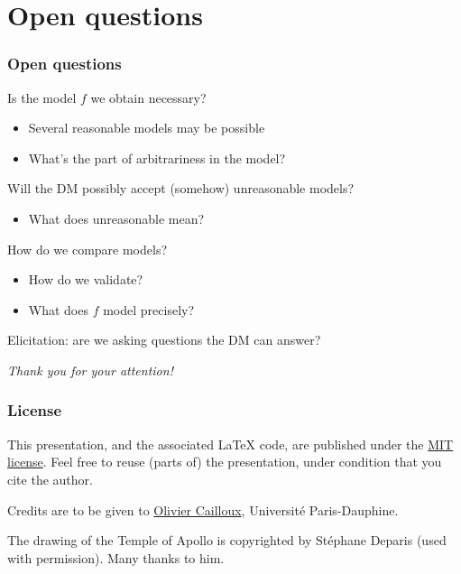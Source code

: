 \documentclass[french,english]{beamer}
\begin{document}
\section{Open questions}
\begin{frame}
	\frametitle{Open questions}
	Is the model $f$ we obtain necessary?
	\begin{itemize}
		\item Several reasonable models may be possible
		\item What’s the part of arbitrariness in the model?
	\end{itemize}
	Will the \ac{DM} possibly accept (somehow) unreasonable models?
	\begin{itemize}
		\item What does unreasonable mean?
	\end{itemize}
	How do we compare models?
	\begin{itemize}
		\item How do we validate?
		\item What does $f$ model precisely?
	\end{itemize}
	Elicitation: are we asking questions the \ac{DM} can answer?
\end{frame}

\begin{frame}[plain]
	\addtocounter{framenumber}{-1}
	\begin{center}
		\huge
		\textit{Thank you for your attention!}
	\end{center}
\end{frame}

\appendix
\AtBeginSection{
}

\clearpage{}
\begin{frame}
	\frametitle{\refname}
 	
\end{frame}

\clearpage{}
\begin{frame}[plain]
	\frametitle{License}
	This presentation, and the associated \LaTeX{} code, are published under the \href{http://opensource.org/licenses/MIT}{MIT license}. Feel free to reuse (parts of) the presentation, under condition that you cite the author.
	
	Credits are to be given to \href{http://www.lamsade.dauphine.fr/~ocailloux/}{Olivier Cailloux}, Université Paris-Dauphine.
	
	The drawing of the Temple of Apollo is copyrighted by Stéphane Deparis (used with permission). Many thanks to him.
\end{frame}
\addtocounter{framenumber}{-1}
\end{document}
